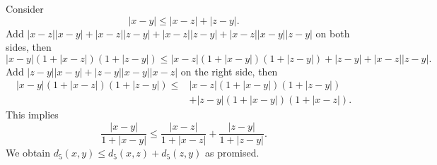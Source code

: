 \begin{Exercise}
\begin{solution}
\begin{itemize}
			Consider
			$$
			|x-y| \leq |x-z| + |z-y|.
			$$
			Add $|x-z| |x-y| + |x-z| |z-y| + |x-z| |z-y| + |x-z| |x-y| |z-y|$ on both sides, then
			$$
			|x-y|(1+|x-z|)(1+|z-y|) \leq |x-z|(1+|x-y|)(1+|z-y|) + |z-y| + |x-z| |z-y|.
			$$
			Add $|z-y| |x-y| + |z-y| |x-y| |x-z|$ on the right side, then
			\begin{align*}
			|x-y|(1+|x-z|)(1+|z-y|) 
			\leq& |x-z|(1+|x-y|)(1+|z-y|) \\
			\quad& +|z-y|(1+|x-y|)(1+|x-z|).
			\end{align*}
			This implies
			$$
			\frac{|x-y|}{1+|x-y|} \leq \frac{|x-z|}{1+|x-z|} + \frac{|z-y|}{1+|z-y|}.
			$$
			We obtain $d_5(x,y) \leq d_5(x,z) + d_5(z,y)$ as promised.
		\end{itemize}
	\end{solution}
\end{Exercise}